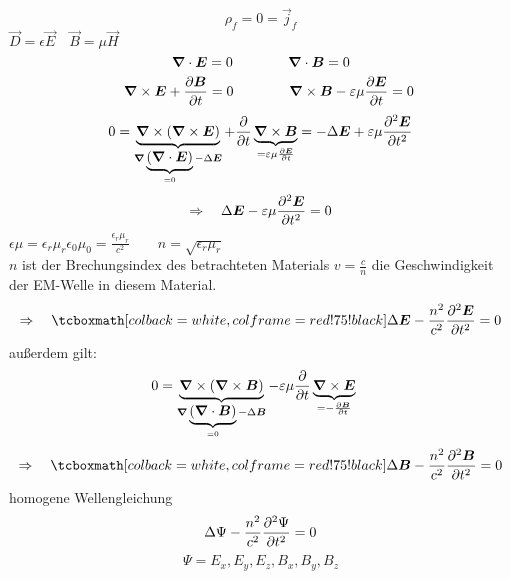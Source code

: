 \begin{equation*}
\rho_f = 0 = \vec{j}_f
\end{equation*}
$ \vec{D} = \epsilon \vec{E} \quad \vec{B} = \mu \vec{H} $
\begin{equation*}
\bm{\nabla} \cdot \bm{E} = 0 \qquad \qquad \bm{\nabla} \cdot \bm{B} = 0
\end{equation*}
\begin{equation*}
\quad \, \bm{\nabla} \times \bm{E} + \frac{\partial \bm{B}}{\partial t} = 0 \qquad \qquad \bm{\nabla} \times \bm{B} - \varepsilon \mu \frac{\partial \bm{E}}{\partial t} = 0
\end{equation*}
\begin{equation*}
0 = \underbrace{\bm{\nabla} \times \left(\bm{\nabla} \times \bm{E}\right)}_{\bm{\nabla}\underbrace{(\bm{\nabla} \cdot \bm{E})}_{= 0} - \Delta \bm{E}} + \frac{\partial }{\partial t} \underbrace{\bm{\nabla} \times \bm{B}}_{= \varepsilon \mu \frac{\partial \bm{E}}{\partial t}} = - \Delta \bm{E} + \varepsilon \mu \frac{\partial ^2 \bm{E}}{\partial t^2}
\end{equation*}
\begin{equation*}
\Rightarrow \quad \Delta \bm{E} - \varepsilon \mu \frac{\partial ^2 \bm{E}}{\partial t^2} = 0
\end{equation*}
$ \epsilon \mu = \epsilon_r \mu_r \epsilon_0 \mu_0 = \frac{\epsilon_r \mu_r}{c^2} \qquad n = \sqrt{\epsilon_r \mu_r} $\\[5pt]
$ n $ ist der Brechungsindex des betrachteten Materials $ v = \frac{c}{n} $ die Geschwindigkeit der EM-Welle in diesem Material.
\begin{equation*}
\Rightarrow \quad \rmbox{\Delta \vec{E} - \frac{n^2}{c^2} \prt{^2 \vec{E}}{t^2} = 0}
\end{equation*}
außerdem gilt:
\begin{align*}
0 &= \underbrace{\bm{\nabla} \times (\bm{\nabla} \times \bm{B})}_{\bm{\nabla} \underbrace{(\bm{\nabla} \cdot \bm{B})}_{= 0} - \Delta \bm{B}} - \varepsilon \mu \frac{\partial }{\partial t} \underbrace{\bm{\nabla} \times \bm{E}}_{= - \frac{\partial \bm{B}}{\partial t}}
\end{align*}
\begin{equation*}
\Rightarrow \quad \rmbox{\Delta \vec{B} - \frac{n^2}{c^2} \prt{^2 \vec{B}}{t^2} = 0}
\end{equation*}
homogene Wellengleichung
\begin{equation*}
\Delta \Psi - \frac{n^2}{c^2} \frac{\partial ^2 \Psi}{\partial t^2} = 0
\end{equation*}
\begin{equation*}
\Psi = E_x, E_y, E_z, B_x, B_y, B_z
\end{equation*}

